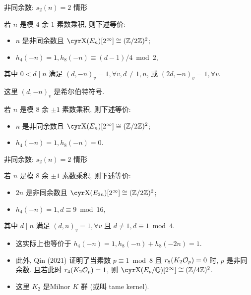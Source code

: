 \documentclass[handout,aspectratio=169]{ctexbeamer}
\begin{document}
\begin{frame}{非同余数: $s_2(n)=2$ 情形}
	\onslide<+->
	\begin{theorem}[nearprev][{Wang 2016}]
		若 $n$ 是模 $4$ 余 $1$ 素数乘积, 则下述等价:
		\begin{itemize}[<*>]
			\item $n$ 是非同余数且 $\Sha(E_n)[2^\infty]\cong(\BZ/2\BZ)^2$;
			\item $h_4(-n)=1,h_8(-n)\equiv (d-1)/4\bmod 2$,
		\end{itemize}
		其中 $0<d\mid n$ 满足 $(d,-n)_v=1,\forall v, d\ne 1,n$, 或 $(2d,-n)_v=1,\forall v$.
	\end{theorem}
	这里 $(d,-n)_v$ 是希尔伯特符号.
	\onslide<+->
	\begin{theorem}
		若 $n$ 是模 $8$ 余 $\pm1$ 素数乘积, 则下述等价:
		\begin{itemize}[<*>]
			\item $n$ 是非同余数且 $\Sha(E_n)[2^\infty]\cong(\BZ/2\BZ)^2$;
			\item $h_4(-n)=1, h_8(-n)=0$.
		\end{itemize}
	\end{theorem}
\end{frame}


\begin{frame}{非同余数: $s_2(n)=2$ 情形}
	\onslide<+->
	\begin{theorem}[][{Zhang 2023}]
		\label{thm:3}
		若 $n$ 是模 $8$ 余 $\pm1$ 素数乘积, 则下述等价:
		\begin{itemize}[<*>]
			\item $2n$ 是非同余数且 $\Sha(E_{2n})[2^\infty]\cong(\BZ/2\BZ)^2$;
			\item $h_4(-n)=1,d\equiv 9\bmod 16$,
		\end{itemize}
		其中 $d\mid n$ 满足 $(d,n)_v=1,\forall v$ 且 $d\ne 1,d\equiv 1\bmod 4$.
	\end{theorem}
	\begin{itemize}
		\item 这实际上也等价于 $h_4(-n)=1,h_8(-n)+h_8(-2n)=1$.
		\item 此外, Qin (2021) 证明了当素数 $p\equiv 1\bmod 8$ 且 $r_8(K_2{\mathcal{O}}_p)=0$ 时, $p$ 是非同余数.
		且若此时 $r_4(K_2{\mathcal{O}}_p)=1$, 则 $\Sha(E_p/\BQ)[2^\infty]\cong(\BZ/4\BZ)^2$.
		\item 这里 $K_2$ 是Milnor $K$ 群 (或叫 tame kernel).
	\end{itemize}  
\end{frame}
\end{document}

